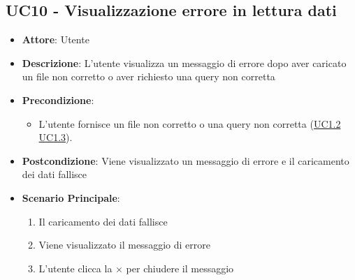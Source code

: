 \subsection{UC10 - Visualizzazione errore in lettura dati}
    \label{uc10}
    \begin{itemize}
    \item \textbf{Attore}: Utente
    \item \textbf{Descrizione}: L’utente visualizza un messaggio di errore dopo aver caricato un file non corretto o aver richiesto una query non corretta
    \item \textbf{Precondizione}: 
    \begin{itemize}
        \item L'utente fornisce un file non corretto o una query non corretta (\hyperref[uc1.2]{UC1.2} \hyperref[uc1.3]{UC1.3}).
    \end{itemize}  
    \item \textbf{Postcondizione}: Viene visualizzato un messaggio di errore e il caricamento dei dati fallisce
    \item \textbf{Scenario Principale}: 
    \begin{enumerate}
        \item Il caricamento dei dati fallisce
        \item Viene visualizzato il messaggio di errore
        \item L'utente clicca la $\times$ per chiudere il messaggio
    \end{enumerate}
    \end{itemize}